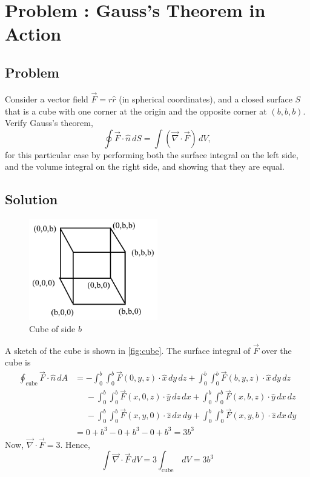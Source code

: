 \documentclass[solutions]{esg8022pset}
\begin{document}
\section{Problem \thesection: Gauss's Theorem in Action}
\subsection{Problem}
  Consider a vector field
  $\vec{F} = r\hat{r}$ (in spherical coordinates), and a closed
  surface $S$ that is a cube with one corner at the origin and the
  opposite corner at $(b,b,b)$.  Verify Gauss's theorem,
  $$\oint \vec{F}\cdot\hat{n}\,dS = \int (\vec{\nabla}\cdot\vec{F})\,dV,$$
  for this particular case by performing both the surface integral on the
  left side, and the volume integral on the right side, and showing that
  they are equal.
\subsection{Solution}
  \begin{figure}[h]
    \centering
    \includegraphics[width=0.5\textwidth]{ps03_sol_04}
    \caption{Cube of side $b$}
    \label{fig:cube}
  \end{figure}
  A sketch of the cube is shown in \autoref{fig:cube}. The surface integral of $\vec{F}$ over the cube is
  \begin{align*}
    \mathop{\oint}_{\text{cube}}\vec{F}\cdot\hat{n}\,dA & = -\int_{0}^b\int_{0}^b\vec{F}(0,y,z)\cdot \hat x\,dy\,dz + \int_{0}^b\int_{0}^b\vec{F}(b,y,z)\cdot \hat x\,dy\,dz \\
    & \phantom{=} -\int_{0}^b\int_{0}^b\vec{F}(x,0,z)\cdot \hat y\,dz\,dx + \int_{0}^b\int_{0}^b\vec{F}(x,b,z)\cdot \hat y\,dx\,dz \\
    & \phantom{=} -\int_{0}^b\int_{0}^b\vec{F}(x,y,0)\cdot \hat z\,dx\,dy + \int_{0}^b\int_{0}^b\vec{F}(x,y,b)\cdot \hat z\,dx\,dy \\
    & = 0 + b^3 -0 + b^3 - 0 + b^3 = 3 b^3
  \end{align*}
  Now, $\vec{\nabla}\cdot \vec{F} =3$. Hence,
  $$\int \vec{\nabla}\cdot \vec{F}\,dV = 3 \mathop{\int}_{\text{cube}}\,dV = 3 b^3$$
\end{document}
